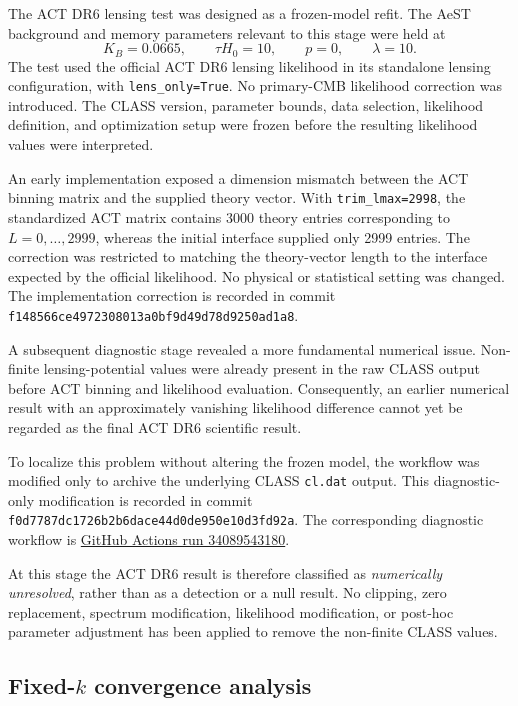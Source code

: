 The ACT DR6 lensing test was designed as a frozen-model refit. The AeST background and memory parameters relevant to this stage were held at
\begin{equation}
K_B=0.0665,\qquad \tau H_0=10,\qquad p=0,\qquad \lambda=10.
\end{equation}
The test used the official ACT DR6 lensing likelihood in its standalone lensing configuration, with \texttt{lens\_only=True}. No primary-CMB likelihood correction was introduced. The CLASS version, parameter bounds, data selection, likelihood definition, and optimization setup were frozen before the resulting likelihood values were interpreted.

An early implementation exposed a dimension mismatch between the ACT binning matrix and the supplied theory vector. With \texttt{trim\_lmax=2998}, the standardized ACT matrix contains 3000 theory entries corresponding to $L=0,\ldots,2999$, whereas the initial interface supplied only 2999 entries. The correction was restricted to matching the theory-vector length to the interface expected by the official likelihood. No physical or statistical setting was changed. The implementation correction is recorded in commit \texttt{f148566ce4972308013a0bf9d49d78d9250ad1a8}.

A subsequent diagnostic stage revealed a more fundamental numerical issue. Non-finite lensing-potential values were already present in the raw CLASS output before ACT binning and likelihood evaluation. Consequently, an earlier numerical result with an approximately vanishing likelihood difference cannot yet be regarded as the final ACT DR6 scientific result.

To localize this problem without altering the frozen model, the workflow was modified only to archive the underlying CLASS \texttt{cl.dat} output. This diagnostic-only modification is recorded in commit \texttt{f0d7787dc1726b2b6dace44d0de950e10d3fd92a}. The corresponding diagnostic workflow is \href{https://github.com/dvlahek/aest-memory-gravity/actions/runs/34089543180}{GitHub Actions run 34089543180}.

At this stage the ACT DR6 result is therefore classified as \emph{numerically unresolved}, rather than as a detection or a null result. No clipping, zero replacement, spectrum modification, likelihood modification, or post-hoc parameter adjustment has been applied to remove the non-finite CLASS values.

\subsection{Fixed-$k$ convergence analysis}
\label{sec:fixed_k_convergence}

